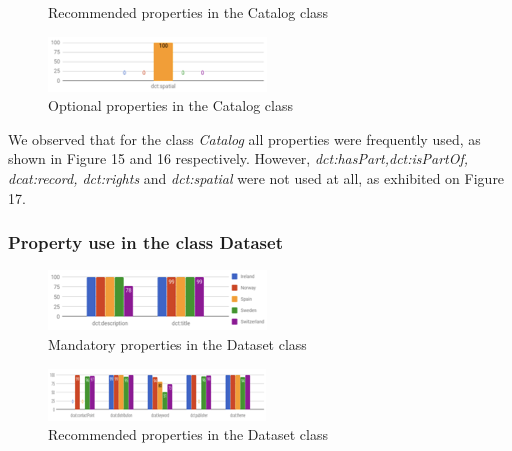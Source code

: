 \documentclass[<options>]{elsarticle}
\begin{document}
\begin{figure}[H]
\caption{Recommended properties in the Catalog class}
\end{figure}

\begin{figure}[H]
\includegraphics{Replace6.png}
\caption{Optional properties in the Catalog class}
\end{figure}

We observed that for the class \textit{Catalog} all properties were frequently used, as shown in Figure 15 and 16 respectively. However, \textit{dct:hasPart,dct:isPartOf, dcat:record, dct:rights} and \textit{dct:spatial} were not used at all, as exhibited on Figure 17.

\subsubsection{Property use in the class Dataset}

\begin{figure}[H]
\includegraphics{replace7.png}
\caption{Mandatory properties in the Dataset class}
\end{figure}

\begin{figure}[H]
\includegraphics{replace8.png}
\caption{Recommended properties in the Dataset class}
\end{figure}
\end{document}
